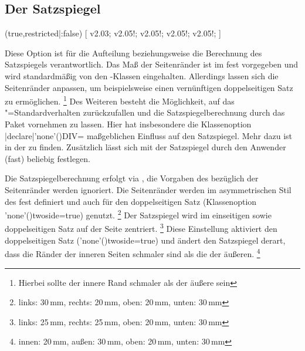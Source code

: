 \begin{DeclareEntity*}{}
\begin{DeclareEntity*}{}
\begin{DeclareEntity*}{}
\subsection{%
  Der Satzspiegel%
}

\begin{Declaration}
  {}
  (true,restricted|:false)
[%
  v2.03;
  v2.05!;%
  v2.05!;%
  v2.05!;%
  v2.05!;%
]
\printdeclarationlist

Diese Option ist für die Aufteilung beziehungsweise die Berechnung des 
Satzspiegels verantwortlich. Das Maß der Seitenränder ist im \CD fest 
vorgegeben und wird standardmäßig von den \TUDScript-Klassen eingehalten. 
Allerdings lassen sich die Seitenränder anpassen, um beispielsweise einen 
vernünftigen doppelseitigen Satz zu ermöglichen.%
\footnote{Hierbei sollte der innere Rand schmaler als der äußere sein}
Des Weiteren besteht die Möglichkeit, auf das \KOMAScript"=Standardverhalten 
zurückzufallen und die Satzspiegelberechnung durch das Paket  
vornehmen zu lassen. Hier hat insbesondere die Klassenoption 
\Option|declare|'none'(){DIV=\PMisc} maßgeblichen Einfluss auf
den Satzspiegel. Mehr dazu ist in der  
zu finden.
%
Zusätzlich lässt sich mit  der Satzspiegel durch den 
Anwender (fast) beliebig festlegen.
\begin{DeclareValues}{}
  Die Satzspiegelberechnung erfolgt via , die Vorgaben des 
  \CDs bezüglich der Seitenränder werden ignoriert.
  Die Seitenränder werden im asymmetrischen Stil des \CDs fest definiert und 
  auch für den doppelseitigen Satz
  (Klassenoption \Option'none'(){twoside=true}) genutzt.%
  \footnote{links: 30\,mm, rechts: 20\,mm, oben: 20\,mm, unten: 30\,mm}
  Der Satzspiegel wird im einseitigen sowie doppelseitigen Satz auf der Seite 
  zentriert.%
  \footnote{links: 25\,mm, rechts: 25\,mm, oben: 20\,mm, unten: 30\,mm}
  Diese Einstellung aktiviert den doppelseitigen Satz 
  (\Option'none'(){twoside=true}) und ändert den Satzspiegel 
  derart, dass die Ränder der inneren Seiten schmaler sind als die der äußeren.%
  \footnote{innen: 20\,mm, außen: 30\,mm, oben: 20\,mm, unten: 30\,mm}

\end{DeclareValues}
\end{Declaration}
\end{DeclareEntity*}
\end{DeclareEntity*}
\end{DeclareEntity*}
